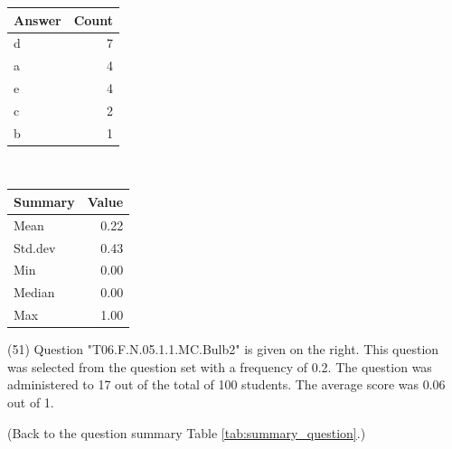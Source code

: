 \documentclass[12pt,nohyper]{tufte-handout}\usepackage[]{graphicx}\usepackage[]{color}
\begin{document}
\begin{center}%
\begin{tabular}{lr}
  \hline
Answer & Count \\ 
  \hline
d &   7 \\ 
  a &   4 \\ 
  e &   4 \\ 
  c &   2 \\ 
  b &   1 \\ 
   \hline
\end{tabular}
~~~~~~~~%
\begin{tabular}{lr}
  \hline
Summary & Value \\ 
  \hline
Mean & 0.22 \\ 
  Std.dev & 0.43 \\ 
  Min & 0.00 \\ 
  Median & 0.00 \\ 
  Max & 1.00 \\ 
   \hline
\end{tabular}
\end{center}\newpage{} (51) Question "T06.F.N.05.1.1.MC.Bulb2" is given on the right. This question was selected from the question set with a frequency of 0.2. The question was administered to 17 out of the total of 100 students. The average score was 0.06 out of 1.

 (Back to the question summary Table \ref{tab:summary_question}.)
\end{document}

